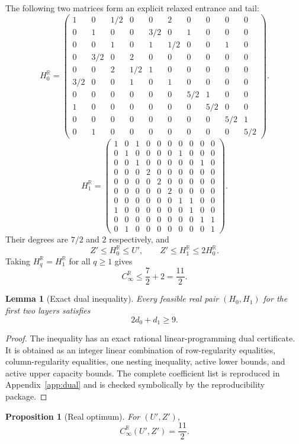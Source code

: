 \documentclass[11pt]{article}
\newtheorem{proposition}[theorem]{Proposition}
\newtheorem{lemma}[theorem]{Lemma}
\theoremstyle{definition}
\newcommand{\R}{\mathbb R}
\begin{document}
The following two matrices form an explicit relaxed entrance and tail:
{\scriptsize
\[
H_0^\R=
\begin{pmatrix}
1&0&1/2&0&0&2&0&0&0&0\\
0&1&0&0&3/2&0&1&0&0&0\\
0&0&1&0&1&1/2&0&0&1&0\\
0&3/2&0&2&0&0&0&0&0&0\\
0&0&2&1/2&1&0&0&0&0&0\\
3/2&0&0&1&0&1&0&0&0&0\\
0&0&0&0&0&0&5/2&1&0&0\\
1&0&0&0&0&0&0&5/2&0&0\\
0&0&0&0&0&0&0&0&5/2&1\\
0&1&0&0&0&0&0&0&0&5/2
\end{pmatrix}.
\]
\[
H_1^\R=
\begin{pmatrix}
1&0&1&0&0&0&0&0&0&0\\
0&1&0&0&0&0&1&0&0&0\\
0&0&1&0&0&0&0&0&1&0\\
0&0&0&2&0&0&0&0&0&0\\
0&0&0&0&2&0&0&0&0&0\\
0&0&0&0&0&2&0&0&0&0\\
0&0&0&0&0&0&1&1&0&0\\
1&0&0&0&0&0&0&1&0&0\\
0&0&0&0&0&0&0&0&1&1\\
0&1&0&0&0&0&0&0&0&1
\end{pmatrix}.
\]
}
Their degrees are $7/2$ and $2$ respectively, and
\[
Z'\le H_0^\R\le U',
\qquad
Z'\le H_1^\R\le2H_0^\R.
\]
Taking $H_q^\R=H_1^\R$ for all $q\ge1$ gives
\[
C_\infty^\R\le\frac72+2=\frac{11}{2}.
\]

\begin{lemma}[Exact dual inequality]
\label{lem:dual}
Every feasible real pair $(H_0,H_1)$ for the first two layers satisfies
\[
2d_0+d_1\ge9.
\]
\end{lemma}

\begin{proof}
The inequality has an exact rational linear-programming dual certificate.
It is obtained as an integer linear combination of row-regularity equalities,
column-regularity equalities, one nesting inequality, active lower bounds, and active upper
capacity bounds.  The complete coefficient list is reproduced in Appendix~\ref{app:dual} and is
checked symbolically by the reproducibility package.
\end{proof}

\begin{proposition}[Real optimum]
\label{prop:realopt}
For $(U',Z')$,
\[
C_\infty^\R(U',Z')=\frac{11}{2}.
\]
\end{proposition}
\end{document}
